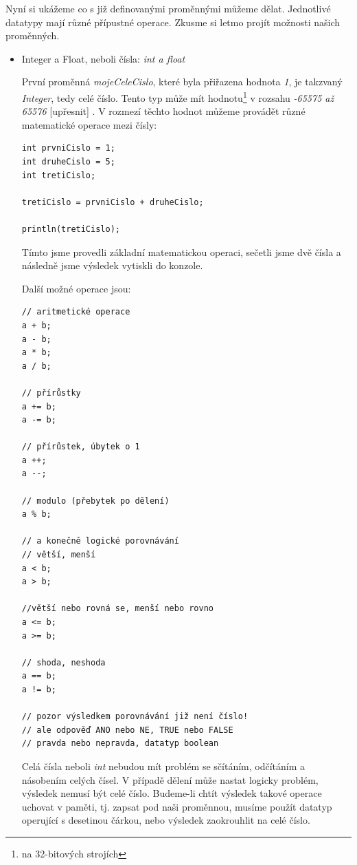 \documentclass[10pt]{book}
\begin{document}
Nyní si ukážeme co s již definovanými proměnnými můžeme dělat. Jednotlivé datatypy mají různé přípustné operace. Zkusme si letmo projít možnosti našich proměnných.

\begin{itemize}


\item{Integer a Float, neboli čísla: {\em int a float}}

První proměnná {\em mojeCeleCislo}, které byla přiřazena hodnota {\em 1}, je takzvaný {\em Integer}, tedy celé číslo. Tento typ může mít hodnotu\footnote{na 32-bitových strojích} v rozsahu {\em -65575 až 65576} [upřesnit] . V rozmezí těchto hodnot můžeme provádět různé matematické operace mezi čísly:

\begin{lstlisting}
int prvniCislo = 1;
int druheCislo = 5;
int tretiCislo;

tretiCislo = prvniCislo + druheCislo;

println(tretiCislo);
\end{lstlisting}

Tímto jsme provedli základní matematickou operaci, sečetli jsme dvě čísla a následně jsme výsledek vytiskli do konzole.

Další možné operace jsou:

\begin{lstlisting}
// aritmetické operace
a + b;
a - b;
a * b;
a / b;

// přírůstky
a += b;
a -= b;

// přírůstek, úbytek o 1
a ++;
a --;

// modulo (přebytek po dělení)
a % b;

// a konečně logické porovnávání
// větší, menší
a < b;
a > b;

//větší nebo rovná se, menší nebo rovno
a <= b;
a >= b;

// shoda, neshoda
a == b;
a != b;

// pozor výsledkem porovnávání již není číslo!
// ale odpověď ANO nebo NE, TRUE nebo FALSE
// pravda nebo nepravda, datatyp boolean

\end{lstlisting}

Celá čísla neboli {\em int} nebudou mít problém se sčítáním, odčítáním a násobením celých čísel. V případě dělení může nastat logicky problém, výsledek nemusí být celé číslo. Budeme-li chtít výsledek takové operace uchovat v paměti, tj. zapsat pod naši proměnnou, musíme použít datatyp operující s desetinou čárkou, nebo výsledek zaokrouhlit na celé číslo.


\end{itemize}
\end{document}
